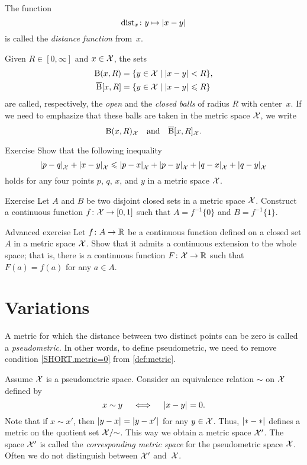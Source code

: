 The function 
\[\distfun_x\:y\mapsto \dist{x}{y}{}\]
is called the \emph{distance function} from~$x$. 

Given $R\in[0,\infty]$ and $x\in \mathcal{X}$, the sets
\begin{align*}
\oBall(x,R)&=\{y\in \spc{X}\mid \dist{x}{y}{}<R\},
\\
\cBall[x,R]&=\{y\in \spc{X}\mid \dist{x}{y}{}\le R\}
\end{align*}
are called, respectively, the  \emph{open} and  the \emph{closed  balls}   of radius $R$ with center~$x$.
If we need to emphasize that these balls are taken in the metric space $\mathcal{X}$,
we write 
\[\mathrm{B}{}(x,R)_{\mathcal{X}}\quad\text{and}\quad\overline{\mathrm{B}}{}[x,R]_{\mathcal{X}}.\]

\begin{thm}{Exercise}\label{ex:quad-inq}
Show that the following inequality
\[\dist{p}{q}{\spc{X}}+\dist{x}{y}{\spc{X}}\le\dist{p}{x}{\spc{X}}+\dist{p}{y}{\spc{X}}+\dist{q}{x}{\spc{X}}+\dist{q}{y}{\spc{X}}\]
holds for any four points $p$, $q$, $x$, and $y$ in a metric space $\mathcal{X}$.
\end{thm}

\begin{thm}{Exercise}\label{ex:normal}
Let $A$ and $B$ be two disjoint closed sets in a metric space $\mathcal{X}$.
Construct a continuous function $f\colon\mathcal{X}\to [0,1]$ such that $A=f^{-1}\{0\}$ and $B=f^{-1}\{1\}$.
\end{thm}

\begin{thm}{Advanced exercise}\label{ex:tietze}
Let $f\colon A\to\mathbb{R}$ be a continuous function defined on a closed set $A$ in a metric space $\mathcal{X}$.
Show that it admits a continuous extension to the whole space;
that is, there is a continuous function $F\colon\mathcal{X}\to\mathbb{R}$ such that $F(a)=f(a)$ for any $a\in A$.
\end{thm}



\section{Variations}

A metric for which the distance between two distinct points can be zero is called a \emph{pseudometric}.
In other words, to define pseudometric, we need to remove condition \ref{SHORT.metric=0} from \ref{def:metric}.

Assume $\mathcal{X}$ is a pseudometric space.
Consider an equivalence relation $\sim$ on $\mathcal{X}$ defined by
\[x\sim y\quad\iff\quad\dist{x}{y}{}=0.\] 
Note that if $x\sim x'$, then $\dist{y}{x}{}=\dist{y}{x'}{}$ for any $y\in\mathcal{X}$.
Thus, $\dist{*}{*}{}$ defines a metric on the
quotient set $\mathcal{X}/{\sim}$.
This way we obtain a metric space $\mathcal{X}'$.
The space $\mathcal{X}'$ is called the 
\emph{corresponding metric space} for the pseudometric space $\mathcal{X}$.
Often we do not distinguish between $\mathcal{X}'$ and~$\mathcal{X}$. 

